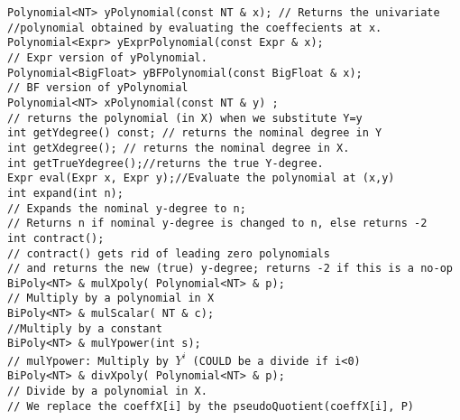 \begin{progb}{
\> \tt Polynomial<NT> yPolynomial(const NT \& x); // Returns the univariate\\
\> \> //polynomial obtained by evaluating the coeffecients at x.\\
\> \tt  Polynomial<Expr> yExprPolynomial(const Expr \& x);\\
\> \>   // Expr version of yPolynomial.\\
\> \tt  Polynomial<BigFloat> yBFPolynomial(const BigFloat \& x);\\
\> \>   // BF version of yPolynomial\\
\> \tt  Polynomial<NT> xPolynomial(const NT \& y) ;\\
\> \>   //   returns the polynomial (in X) when we substitute Y=y\\
\> \tt  int getYdegree() const; // returns the nominal degree in Y\\
\> \tt  int getXdegree(); // returns the nominal degree in X.\\
\> \tt  int getTrueYdegree();//returns the true Y-degree.\\
\> \tt  Expr eval(Expr x, Expr y);//Evaluate the polynomial at (x,y)\\
\> \tt  int expand(int n);\\
\> \>   // Expands the nominal y-degree to n;\\
\> \>   // Returns n if nominal y-degree is changed to n, else returns -2\\
\> \tt  int contract();\\
\> \>   // contract() gets rid of leading zero polynomials\\
\> \>   // and returns the new (true) y-degree; returns -2 if this is a no-op\\
\> \tt  BiPoly<NT> \& mulXpoly( Polynomial<NT> \& p);\\
\> \>   // Multiply by a polynomial in X\\
\> \tt  BiPoly<NT> \& mulScalar( NT \& c);\\
\> \>   //Multiply by a constant\\
\> \tt  BiPoly<NT> \& mulYpower(int s);\\
\> \>  // mulYpower: Multiply by $Y^i$ (COULD be a divide if i<0)\\
\> \tt  BiPoly<NT> \& divXpoly( Polynomial<NT> \& p);\\
\> \>   // Divide by a polynomial in X.\\
\> \>   // We replace the coeffX[i] by the pseudoQuotient(coeffX[i], P)\\
}
\end{progb}
